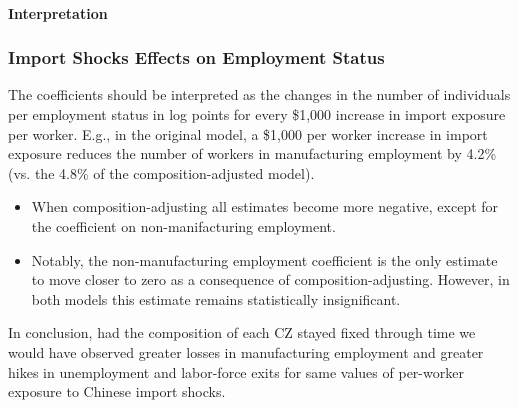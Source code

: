 \begin{frame}
    \framesubtitle{Interpretation}
    
    \frametitle{Import Shocks Effects on Employment Status}
    The coefficients should be interpreted as the changes in the number of individuals per employment status in log points for every \$1,000 increase in import exposure per worker.
    E.g., in the original model, a \$1,000 per worker increase in import exposure reduces the number of workers in manufacturing employment by 4.2\% (vs. the 4.8\% of the composition-adjusted model).

    \begin{itemize}
        \item When composition-adjusting all estimates become more negative, except for the coefficient on non-manifacturing employment.
        \item Notably, the non-manufacturing employment coefficient is the only estimate to move closer to zero as a consequence of composition-adjusting. However, in both models this estimate remains statistically insignificant.
    \end{itemize}

    In conclusion, had the composition of each CZ stayed fixed through time we would have observed greater losses in manufacturing employment and greater hikes in unemployment and labor-force exits for same values of per-worker exposure to Chinese import shocks.
\end{frame}

